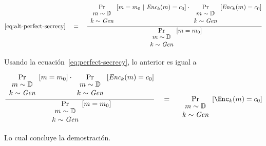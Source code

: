 \begin{enumerate}
    \begin{equation*}
      \eqref{eq:alt-perfect-secrecy}\quad = \quad \frac{\underset{ \begin{array}{cc} m\sim\mathbb{D}\\ k\sim\textit{Gen} \end{array} } {\Pr}[m=m_0\ |\ \textit{Enc}_k(m)=c_0]\cdot \underset{ \begin{array}{cc} m\sim\mathbb{D}\\ k\sim\textit{Gen} \end{array} } {\Pr}[\textit{Enc}_k(m)=c_0]}{\underset{ \begin{array}{cc} m\sim\mathbb{D}\\ k\sim\textit{Gen} \end{array} } {\Pr}[m=m_0]}
    \end{equation*}

    Usando la ecuación~\eqref{eq:perfect-secrecy}, lo anterior es igual a

    \begin{equation*}
      \frac{\underset{ \begin{array}{cc} m\sim\mathbb{D}\\ k\sim\textit{Gen} \end{array} } {\Pr}[m=m_0]\cdot \underset{ \begin{array}{cc} m\sim\mathbb{D}\\ k\sim\textit{Gen} \end{array} } {\Pr}[\textit{Enc}_k(m)=c_0]}{\underset{ \begin{array}{cc} m\sim\mathbb{D}\\ k\sim\textit{Gen} \end{array} } {\Pr}[m=m_0]}\quad = \quad \underset{ \begin{array}{cc} m\sim\mathbb{D}\\ k\sim\textit{Gen} \end{array} } {\Pr}[\Enc_k(m)=c_0]
    \end{equation*}

    Lo cual concluye la demostración.
\end{enumerate}
